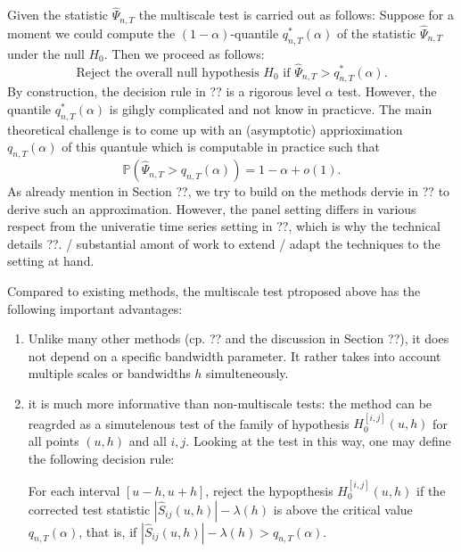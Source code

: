 \documentclass[a4paper,12pt]{article}
\begin{document}
\begin{itemize}[label=--,leftmargin=0.5cm]
\begin{itemize}[leftmargin=1.5cm]
 \end{itemize}
Given the statistic $\hat{\Psi}_{n,T}$ the multiscale test is carried out as follows: Suppose for a moment we could compute the $(1-\alpha)$-quantile $q_{n,T}^*(\alpha)$ of the statistic $\hat{\Psi}_{n,T}$ under the null $H_0$. Then we proceed as follows: 
\[ \text{Reject the overall null hypothesis } H_0 \text{ if } \hat{\Psi}_{n,T} > q_{n,T}^*(\alpha). \]
By construction, the decision rule in ?? is a rigorous level $\alpha$ test. However, the quantile $q_{n,T}^*(\alpha)$ is gihgly complicated and not know in practicve. The main theoretical challenge is to come up with an (asymptotic) apprioximation $q_{n,T}(\alpha)$ of this quantule which is computable in practice such that 
\[ \mathbb{P} (\hat{\Psi}_{n,T} > q_{n,T}(\alpha)) = 1-\alpha + o(1). \]
As already mention in Section ??, we try to build on the methods dervie in ?? to derive such an approximation. However, the panel setting differs in various respect from the univeratie time series setting in ??, which is why the technical details ??. / substantial amont of work to extend / adapt the techniques to the setting at hand. 

Compared to existing methods, the multiscale test ptroposed above has the following important advantages: 
\begin{enumerate}[label=(\roman*),leftmargin=0.75cm]
\item Unlike many other methods (cp. ?? and the discussion in Section ??), it does not depend on a specific bandwidth parameter. It rather takes into account multiple scales or bandwidths $h$ simulteneously. 
\item it is much more informative than non-multiscale tests: the method can be reagrded as a simutelenous test of the family of hypothesis $H_0^{[i,j]}(u,h)$ for all points $(u,h)$ and all $i,j$. Looking at the test in this way, one may define the following decision rule: 

For each interval $[u-h,u+h]$, reject the hypopthesis $H_0^{[i,j]}(u,h)$ if the corrected test statistic $|\hat{S}_{ij}(u,h)| - \lambda(h)$ is above the critical value $q_{n,T}(\alpha)$, that is, if $|\hat{S}_{ij}(u,h)| - \lambda(h) > q_{n,T}(\alpha)$. 


\end{enumerate}
\end{itemize}
\end{document}
